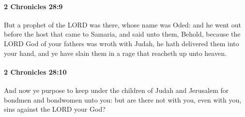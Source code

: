 		\paragraph{2 Chronicles 28:9} %
			\label{2CHRONICLES-28-9}

			But a prophet of the LORD was there, whose name was Oded: and he went out before the host that came to Samaria, and said unto them, Behold, because the LORD God of your fathers was wroth with Judah, he hath delivered them into your hand, and ye have slain them in a rage that reacheth up unto heaven.


		\paragraph{2 Chronicles 28:10} %
			\label{2CHRONICLES-28-10}

			And now ye purpose to keep under the children of Judah and Jerusalem for bondmen and bondwomen unto you: but are there not with you, even with you, sins against the LORD your God?

